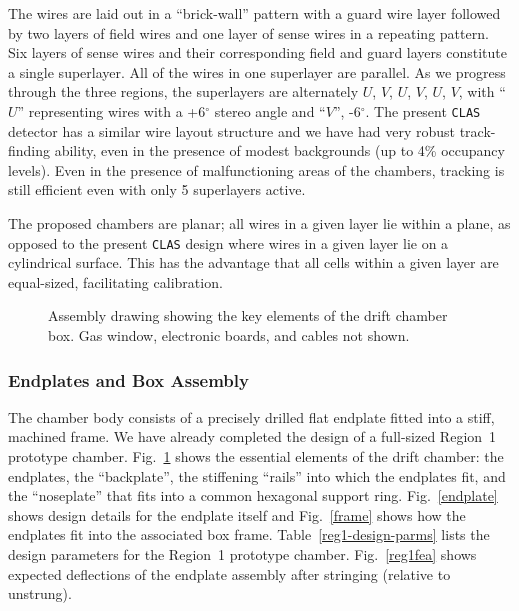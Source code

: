 The wires are laid out in a ``brick-wall'' pattern with a guard wire layer 
followed by two layers of field wires and one layer of sense wires in a 
repeating pattern.  Six layers of sense wires and their corresponding field 
and guard layers constitute a single superlayer.  All of the wires in one 
superlayer are parallel.  As we progress through the three regions, the 
superlayers are alternately $U$, $V$, $U$, $V$, $U$, $V$, with ``$U$'' 
representing wires with a +6$^\circ$ stereo angle and ``$V$'', -6$^\circ$.  
The present {\tt CLAS} detector has a similar wire layout structure and we 
have had very robust track-finding ability, even in the presence of modest 
backgrounds (up to 4\% occupancy levels).  Even in the presence of 
malfunctioning areas of the chambers, tracking is still efficient even with 
only 5 superlayers active.

The proposed chambers are planar; all wires in a given layer lie within
a plane, as opposed to the present {\tt CLAS} design where wires in a given 
layer lie on a cylindrical surface.  This has the advantage that all cells 
within a given layer are equal-sized, facilitating calibration.

\begin{figure}[htbp]
\vspace{9.0cm}
\caption{\small{Assembly drawing showing the key elements of the drift
chamber box.  Gas window, electronic boards, and cables not shown.}}
\label{dcassy}
\end{figure}

\subsubsection{Endplates and Box Assembly}

The chamber body consists of a precisely drilled flat endplate fitted into 
a stiff, machined frame.  We have already completed the design of a 
full-sized Region~1 prototype chamber.  Fig.~\ref{dcassy} shows the 
essential elements of the drift chamber: the endplates, the ``backplate'', 
the stiffening ``rails'' into which the endplates fit, and the ``noseplate'' 
that fits into a common hexagonal support ring.  Fig.~\ref{endplate} shows 
design details for the endplate itself and Fig.~\ref{frame} shows how the 
endplates fit into the associated box frame.  Table~\ref{reg1-design-parms} 
lists the design parameters for the Region~1 prototype chamber.  
Fig.~\ref{reg1fea} shows expected deflections of the endplate assembly after 
stringing (relative to unstrung).

